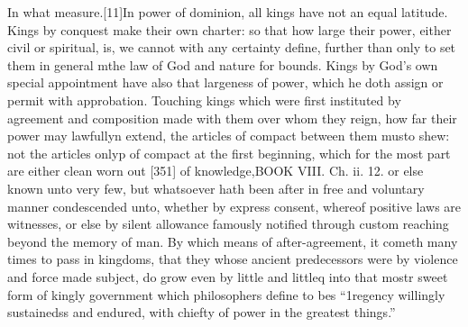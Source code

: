 In what measure.[11]In power of dominion, all kings have not an equal latitude. Kings by conquest make their own charter: so that how large their power, either civil or spiritual, is, we cannot with any certainty define, further than only to set them in general mthe law of God and nature for bounds. Kings by God’s own special appointment have also that largeness of power, which he doth assign or permit with approbation. Touching kings which were first instituted by agreement and composition made with them over whom they reign, how far their power may lawfullyn extend, the articles of compact between them musto shew: not the articles onlyp of compact at the first beginning, which for the most part are either clean worn out [351] of knowledge,BOOK VIII. Ch. ii. 12. or else known unto very few, but whatsoever hath been after in free and voluntary manner condescended unto, whether by express consent, whereof positive laws are witnesses, or else by silent allowance famously notified through custom reaching beyond the memory of man. By which means of after-agreement, it cometh many times to pass in kingdoms, that they whose ancient predecessors were by violence and force made subject, do grow even by little and littleq into that mostr sweet form of kingly government which philosophers define to bes “1regency willingly sustainedss and endured, with chiefty of power in the greatest things.”

